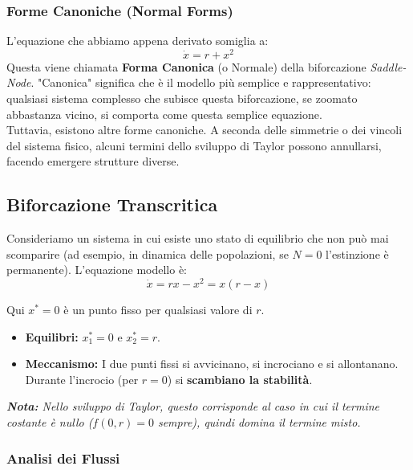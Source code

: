 \documentclass[openany]{book}
\theoremstyle{definition}
\theoremstyle{remark}
\begin{document}
\subsubsection*{Forme Canoniche (Normal Forms)}
L'equazione che abbiamo appena derivato somiglia a:
\begin{equation}
    \boxed{\dot{x} = r + x^2}
\end{equation}
Questa viene chiamata \textbf{Forma Canonica} (o Normale) della biforcazione \textit{Saddle-Node}.
"Canonica" significa che è il modello più semplice e rappresentativo: qualsiasi sistema complesso che subisce questa biforcazione, se zoomato abbastanza vicino, si comporta come questa semplice equazione.
\\
Tuttavia, esistono altre forme canoniche. A seconda delle simmetrie o dei vincoli del sistema fisico, alcuni termini dello sviluppo di Taylor possono annullarsi, facendo emergere strutture diverse.

\subsection{Biforcazione Transcritica}
Consideriamo un sistema in cui esiste uno stato di equilibrio che non può mai scomparire (ad esempio, in dinamica delle popolazioni, se $N=0$ l'estinzione è permanente).
L'equazione modello è:
\[ \dot{x} = rx - x^2 = x(r - x) \]

Qui $x^* = 0$ è un punto fisso per qualsiasi valore di $r$.
\begin{itemize}
    \item \textbf{Equilibri:} $x_1^* = 0$ e $x_2^* = r$.
    \item \textbf{Meccanismo:} I due punti fissi si avvicinano, si incrociano e si allontanano. Durante l'incrocio (per $r=0$) si \textbf{scambiano la stabilità}.
\end{itemize}
\emph{\textbf{Nota:} Nello sviluppo di Taylor, questo corrisponde al caso in cui il termine costante è nullo ($f(0,r)=0$ sempre), quindi domina il termine misto.
}

\subsubsection*{Analisi dei Flussi}
\end{document}
